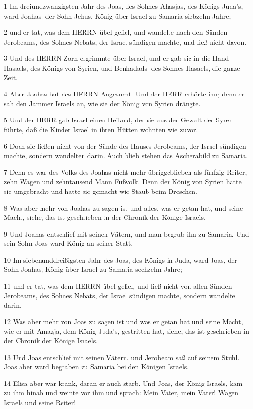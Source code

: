 \par 1 Im dreiundzwanzigsten Jahr des Joas, des Sohnes Ahasjas, des Königs Juda's, ward Joahas, der Sohn Jehus, König über Israel zu Samaria siebzehn Jahre;
\par 2 und er tat, was dem HERRN übel gefiel, und wandelte nach den Sünden Jerobeams, des Sohnes Nebats, der Israel sündigen machte, und ließ nicht davon.
\par 3 Und des HERRN Zorn ergrimmte über Israel, und er gab sie in die Hand Hasaels, des Königs von Syrien, und Benhadads, des Sohnes Hasaels, die ganze Zeit.
\par 4 Aber Joahas bat des HERRN Angesucht. Und der HERR erhörte ihn; denn er sah den Jammer Israels an, wie sie der König von Syrien drängte.
\par 5 Und der HERR gab Israel einen Heiland, der sie aus der Gewalt der Syrer führte, daß die Kinder Israel in ihren Hütten wohnten wie zuvor.
\par 6 Doch sie ließen nicht von der Sünde des Hauses Jerobeams, der Israel sündigen machte, sondern wandelten darin. Auch blieb stehen das Ascherabild zu Samaria.
\par 7 Denn es war des Volks des Joahas nicht mehr übriggeblieben als fünfzig Reiter, zehn Wagen und zehntausend Mann Fußvolk. Denn der König von Syrien hatte sie umgebracht und hatte sie gemacht wie Staub beim Dreschen.
\par 8 Was aber mehr von Joahas zu sagen ist und alles, was er getan hat, und seine Macht, siehe, das ist geschrieben in der Chronik der Könige Israels.
\par 9 Und Joahas entschlief mit seinen Vätern, und man begrub ihn zu Samaria. Und sein Sohn Joas ward König an seiner Statt.
\par 10 Im siebenunddreißigsten Jahr des Joas, des Königs in Juda, ward Joas, der Sohn Joahas, König über Israel zu Samaria sechzehn Jahre;
\par 11 und er tat, was dem HERRN übel gefiel, und ließ nicht von allen Sünden Jerobeams, des Sohnes Nebats, der Israel sündigen machte, sondern wandelte darin.
\par 12 Was aber mehr von Joas zu sagen ist und was er getan hat und seine Macht, wie er mit Amazja, dem König Juda's, gestritten hat, siehe, das ist geschrieben in der Chronik der Könige Israels.
\par 13 Und Joas entschlief mit seinen Vätern, und Jerobeam saß auf seinem Stuhl. Joas aber ward begraben zu Samaria bei den Königen Israels.
\par 14 Elisa aber war krank, daran er auch starb. Und Joas, der König Israels, kam zu ihm hinab und weinte vor ihm und sprach: Mein Vater, mein Vater! Wagen Israels und seine Reiter!
